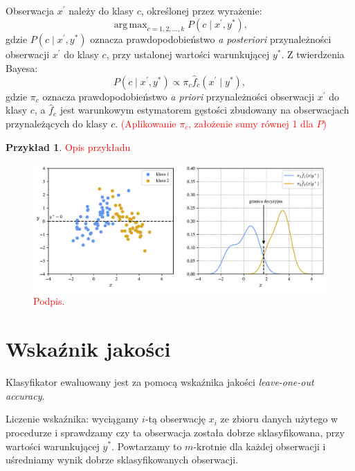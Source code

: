 \documentclass[12pt,a4paper,oneside]{book}
\theoremstyle{definition}
\newtheorem{exmp}{Przykład}[chapter]
\DeclareMathOperator*{\argmax}{arg\,max}
\begin{document}
Obserwacja $x^\prime$ należy do klasy $c$, określonej przez wyrażenie:
\begin{equation} \label{eq:bayes_classifier1}
\argmax_{c=1,2,...,k} P(c \mid x^\prime, y^*),
\end{equation}
gdzie $P(c \mid x^\prime, y^*)$ oznacza prawdopodobieństwo \textit{a posteriori} przynależności obserwacji $x^\prime$ do klasy $c$, przy ustalonej wartości warunkującej $y^*$. Z twierdzenia Bayesa:
\begin{equation} \label{eq:bayes_classifier2}
P(c \mid x^\prime, y^*) \propto \pi_c \hat{f}_c(x^\prime \mid y^*),
\end{equation}
gdzie $\pi_c$ oznacza prawdopodobieństwo \textit{a priori} przynależności obserwacji $x^\prime$ do klasy $c$, a $\hat{f}_c$ jest warunkowym estymatorem gęstości zbudowany na obserwacjach przynależących do klasy $c$. \textcolor{red}{(Aplikowanie $\pi_c$, założenie sumy równej 1 dla $P$)}

\begin{exmp}
\textcolor{red}{Opis przykładu}
\begin{figure}[H]
    \centering
    \includegraphics[scale=0.6]{ckde_classifier_construction}
    \vspace{-0.5cm}
    \caption{\textcolor{red}{Podpis.}}
    \label{fig:ckde_classifier_construction}
\end{figure}
\end{exmp}

\section{Wskaźnik jakości}
Klasyfikator ewaluowany jest za pomocą wskaźnika jakości \textit{leave-one-out accuracy}.

Liczenie wskaźnika: wyciągamy $i$-tą obserwację $x_i$ ze zbioru danych użytego w procedurze i sprawdzamy czy ta obserwacja została dobrze sklasyfikowana, przy wartości warunkującej $y^*$. Powtarzamy to $m$-krotnie dla każdej obserwacji i uśredniamy wynik dobrze sklasyfikowanych obserwacji.
\end{document}
